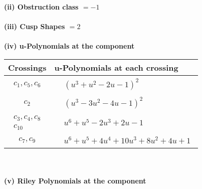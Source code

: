 \documentclass[1p]{elsarticle_modified}
\theoremstyle{definition}
\begin{document}
\flushleft \textbf{(ii) Obstruction class $= -1$}\\~\\
\flushleft \textbf{(iii) Cusp Shapes $= 2$}\\~\\
\newpage\renewcommand{\arraystretch}{1}
\flushleft \textbf{(iv) u-Polynomials at the component}\newline \\
\begin{tabular}{m{50pt}|m{274pt}}
Crossings & \hspace{64pt}u-Polynomials at each crossing \\
\hline $$\begin{aligned}c_{1},c_{5},c_{6}\end{aligned}$$&$\begin{aligned}
&(u^3+u^2-2 u-1)^2
\end{aligned}$\\
\hline $$\begin{aligned}c_{2}\end{aligned}$$&$\begin{aligned}
&(u^3-3 u^2-4 u-1)^2
\end{aligned}$\\
\hline $$\begin{aligned}c_{3},c_{4},c_{8}\\c_{10}\end{aligned}$$&$\begin{aligned}
&u^6+u^5-2 u^3+2 u-1
\end{aligned}$\\
\hline $$\begin{aligned}c_{7},c_{9}\end{aligned}$$&$\begin{aligned}
&u^6+u^5+4 u^4+10 u^3+8 u^2+4 u+1
\end{aligned}$\\
\hline
\end{tabular}\\~\\
\newpage\renewcommand{\arraystretch}{1}
\flushleft \textbf{(v) Riley Polynomials at the component}\newline \\
\end{document}
